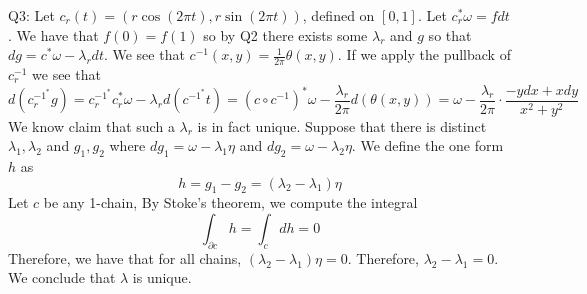 \documentclass[letterpaper]{article}
\newcommand{\bd}{\partial}
\begin{document}
\noindent Q3: Let $c_r (t)= (r\cos(2\pi t), r \sin(2\pi t))$, defined on $[0,1]$. Let $c^*_r \omega = f dt$. We have that $f(0)=f(1)$ so by Q2 there exists some $\lambda_r$ and $g$ so that $dg = c^*\omega -\lambda_r dt$. We see that $c^{-1}(x,y) = \frac{1}{2\pi}\theta(x,y)$. If we apply the pullback of $c_r^{-1}$ we see that
$$d(c_r^{-1^*} g) = c_r^{-1^*}c_r^{*} \omega - \lambda_r d(c^{-1^*}t) = (c\circ c^{-1})^{*}\omega - \frac{\lambda_r}{2\pi}d(\theta(x,y))= \omega - \frac{\lambda_r}{2\pi}\cdot \frac{-ydx+ xdy}{x^2+y^2}$$ We know claim that such a $\lambda_r$ is in fact unique. Suppose that there is distinct $\lambda_1,\lambda_2$ and $g_1,g_2$ where $dg_1 = \omega - \lambda_1 \eta$ and $dg_2 = \omega - \lambda_2 \eta$. 
We define the one form $h$ as $$h = g_1-g_2 =(\lambda_2-\lambda_1)\eta $$ 
Let $c$ be any 1-chain, By Stoke's theorem, we compute the integral $$\int_{\bd c} h = \int_{c} dh = 0$$ Therefore, we have that for all chains, $(\lambda_2-\lambda_1)\eta=0$. Therefore, $\lambda_2-\lambda_1=0$. We conclude that $\lambda$ is unique. 
\end{document}
